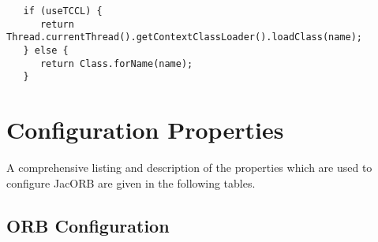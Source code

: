\begin{verbatim}
   if (useTCCL) {
      return Thread.currentThread().getContextClassLoader().loadClass(name);
   } else {
      return Class.forName(name);
   }
\end{verbatim}


\section{Configuration Properties}

A comprehensive listing and description of the properties which are used
to configure JacORB are given in the following tables.

\subsection{ORB Configuration}
